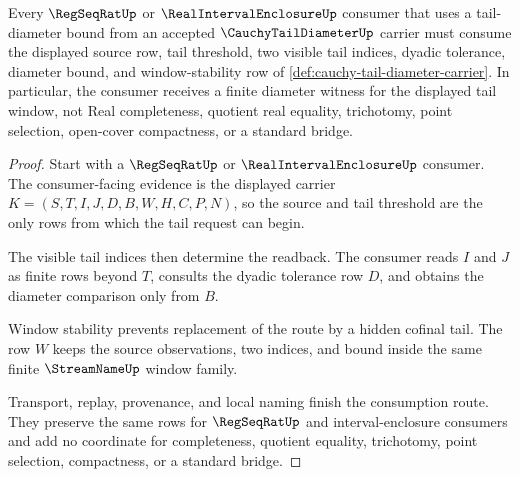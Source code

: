 \begin{theorem}
\label{thm:cauchy-tail-diameter-regseqrat-consumption}
Every $\RegSeqRatUp$ or $\RealIntervalEnclosureUp$ consumer that uses a tail-diameter bound from an accepted $\CauchyTailDiameterUp$ carrier must consume the displayed source row, tail threshold, two visible tail indices, dyadic tolerance, diameter bound, and window-stability row of \autoref{def:cauchy-tail-diameter-carrier}. In particular, the consumer receives a finite diameter witness for the displayed tail window, not Real completeness, quotient real equality, trichotomy, point selection, open-cover compactness, or a standard bridge.
\end{theorem}
\begin{proof}
Start with a $\RegSeqRatUp$ or $\RealIntervalEnclosureUp$ consumer. The consumer-facing evidence is the displayed carrier $K=(S,T,I,J,D,B,W,H,C,P,N)$, so the source and tail threshold are the only rows from which the tail request can begin.

The visible tail indices then determine the readback. The consumer reads $I$ and $J$ as finite rows beyond $T$, consults the dyadic tolerance row $D$, and obtains the diameter comparison only from $B$.

Window stability prevents replacement of the route by a hidden cofinal tail. The row $W$ keeps the source observations, two indices, and bound inside the same finite $\StreamNameUp$ window family.

Transport, replay, provenance, and local naming finish the consumption route. They preserve the same rows for $\RegSeqRatUp$ and interval-enclosure consumers and add no coordinate for completeness, quotient equality, trichotomy, point selection, compactness, or a standard bridge.
\end{proof}

